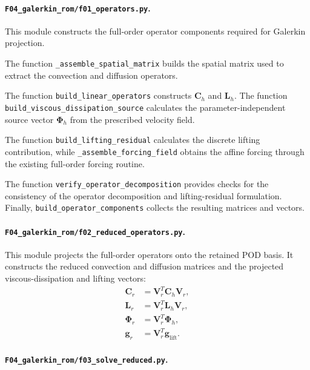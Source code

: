 \paragraph{\texttt{F04\_galerkin\_rom/f01\_operators.py}.}

This module constructs the full-order operator
components required for Galerkin projection.

The function \texttt{\_assemble\_spatial\_matrix}
builds the spatial matrix used to extract the
convection and diffusion operators.

The function \texttt{build\_linear\_operators}
constructs $\mathbf{C}_h$ and $\mathbf{L}_h$.
The function \texttt{build\_viscous\_dissipation\_source}
calculates the parameter-independent source vector
$\boldsymbol{\Phi}_h$ from the prescribed velocity field.

The function \texttt{build\_lifting\_residual}
calculates the discrete lifting contribution, while
\texttt{\_assemble\_forcing\_field} obtains the
affine forcing through the existing full-order
forcing routine.

The function \texttt{verify\_operator\_decomposition}
provides checks for the consistency of the operator
decomposition and lifting-residual formulation.
Finally, \texttt{build\_operator\_components}
collects the resulting matrices and vectors.

\paragraph{\texttt{F04\_galerkin\_rom/f02\_reduced\_operators.py}.}

This module projects the full-order operators onto
the retained POD basis. It constructs the reduced
convection and diffusion matrices and the projected
viscous-dissipation and lifting vectors:
\[
\begin{aligned}
\mathbf{C}_r&=\mathbf{V}_r^T\mathbf{C}_h\mathbf{V}_r,\\
\mathbf{L}_r&=\mathbf{V}_r^T\mathbf{L}_h\mathbf{V}_r,\\
\boldsymbol{\Phi}_r&=\mathbf{V}_r^T\boldsymbol{\Phi}_h,\\
\mathbf{g}_r&=\mathbf{V}_r^T\mathbf{g}_{\mathrm{lift}}.
\end{aligned}
\]

\paragraph{\texttt{F04\_galerkin\_rom/f03\_solve\_reduced.py}.}

